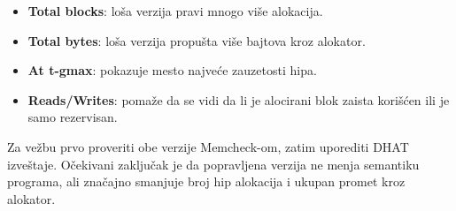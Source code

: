 \begin{itemize}
\tightlist
\item
  \textbf{Total blocks}: loša verzija pravi mnogo više alokacija.
\item
  \textbf{Total bytes}: loša verzija propušta više bajtova kroz alokator.
\item
  \textbf{At t-gmax}: pokazuje mesto najveće zauzetosti hipa.
\item
  \textbf{Reads/Writes}: pomaže da se vidi da li je alocirani blok zaista korišćen ili je samo rezervisan.
\end{itemize}

Za vežbu prvo proveriti obe verzije Memcheck-om, zatim uporediti DHAT izveštaje. Očekivani zaključak je da popravljena verzija ne menja semantiku programa, ali značajno smanjuje broj hip alokacija i ukupan promet kroz alokator.
